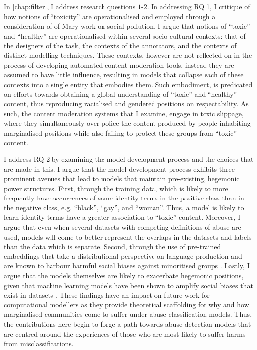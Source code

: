In \cref{chap:filter}, I address research questions $1$-$2$.
In addressing RQ 1, I critique of how notions of ``toxicity'' are operationalised and employed through a consideration of of Mary \citet{Douglas:1966} work on social pollution.
I argue that notions of ``toxic'' and ``healthy'' are operationalised within several socio-cultural contexts: that of the designers of the task, the contexts of the annotators, and the contexts of distinct modelling techniques.
These contexts, however are not reflected on in the process of developing automated content moderation tools, instead they are assumed to have little influence, resulting in models that collapse each of these contexts into a single entity that embodies them.
Such embodiment, is predicated on efforts towards obtaining a global understanding of ``toxic'' and ``healthy'' content, thus reproducing racialised and gendered positions on respectability.
As such, the content moderation systems that I examine, engage in toxic slippage, where they simultaneously over-police the content produced by people inhabiting marginalised positions while also failing to protect these groups from ``toxic'' content.

I address RQ 2 by examining the model development process and the choices that are made in this.
I argue that the model development process exhibits three prominent avenues that lead to models that maintain pre-existing, hegemonic power structures.
First, through the training data, which is likely to more frequently have occurrences of some identity terms in the positive class than in the negative class, e.g. ``black'', ``gay'', and ``woman''.
Thus, a model is likely to learn identity terms have a greater association to ``toxic'' content.
Moreover, I argue that even when several datasets with competing definitions of abuse are used, models will come to better represent the overlaps in the datasets and labels than the data which is separate.
Second, through the use of pre-trained embeddings that take a distributional perspective on language production and are known to harbour harmful social biases against minoritised groups \citep{Speer:2017}.
Lastly, I argue that the models themselves are likely to exacerbate hegemonic positions, given that machine learning models have been shown to amplify social biases that exist in datasets \citep{Zhao:2017}.
These findings have an impact on future work for computational modellers as they provide theoretical scaffolding for why and how marginalised communities come to suffer under abuse classification models.
Thus, the contributions here begin to forge a path towards abuse detection models that are centred around the experiences of those who are most likely to suffer harms from misclassifications.

